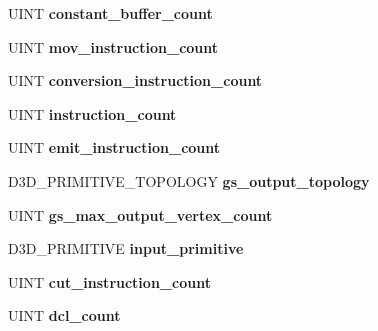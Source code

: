 \begin{DoxyCompactItemize}
U\+I\+NT {\bfseries constant\+\_\+buffer\+\_\+count}
\item 
\mbox{\label{structd3dcompiler__shader__reflection_ae08dd12d039b95c2da02a24ec73030fc}} 
U\+I\+NT {\bfseries mov\+\_\+instruction\+\_\+count}
\item 
\mbox{\label{structd3dcompiler__shader__reflection_a350b3681be6501cb6c109f00295bdeda}} 
U\+I\+NT {\bfseries conversion\+\_\+instruction\+\_\+count}
\item 
\mbox{\label{structd3dcompiler__shader__reflection_a7559fcb09d7f443581d718c2f94f8c6c}} 
U\+I\+NT {\bfseries instruction\+\_\+count}
\item 
\mbox{\label{structd3dcompiler__shader__reflection_a4bc2a24f2461e5aa2c19a6e6a2d99106}} 
U\+I\+NT {\bfseries emit\+\_\+instruction\+\_\+count}
\item 
\mbox{\label{structd3dcompiler__shader__reflection_a4abc875d492fc70820f54a08103ffa59}} 
D3\+D\+\_\+\+P\+R\+I\+M\+I\+T\+I\+V\+E\+\_\+\+T\+O\+P\+O\+L\+O\+GY {\bfseries gs\+\_\+output\+\_\+topology}
\item 
\mbox{\label{structd3dcompiler__shader__reflection_ad03bcdd282bc4b772d989f21ffc5736a}} 
U\+I\+NT {\bfseries gs\+\_\+max\+\_\+output\+\_\+vertex\+\_\+count}
\item 
\mbox{\label{structd3dcompiler__shader__reflection_a88b61da6c48ea78f183acf033cef7c56}} 
D3\+D\+\_\+\+P\+R\+I\+M\+I\+T\+I\+VE {\bfseries input\+\_\+primitive}
\item 
\mbox{\label{structd3dcompiler__shader__reflection_a5b679d4119bb7055447be2a82ce3046b}} 
U\+I\+NT {\bfseries cut\+\_\+instruction\+\_\+count}
\item 
\mbox{\label{structd3dcompiler__shader__reflection_a04c3b330b2a115e5e08b57e73804204a}} 
U\+I\+NT {\bfseries dcl\+\_\+count}
\item 

\end{DoxyCompactItemize}
